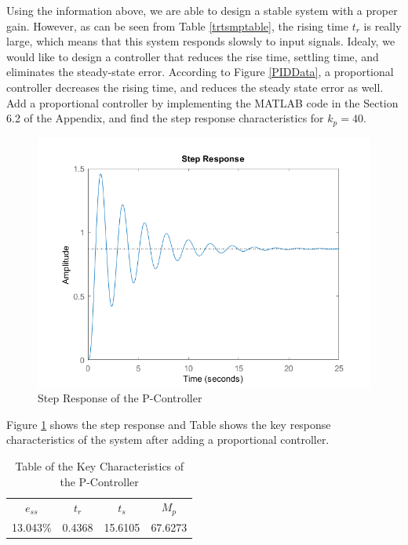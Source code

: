 \documentclass[a4paper, twocolumn, titlepage, 10pt]{article}
\begin{document}
		Using the information above, we are able to design a stable system with a proper gain. However, as can be seen from Table \ref{trtsmptable}, the rising time $t_r$ is really large, which means that this system responds slowsly to input signals. Idealy, we would like to design a controller that reduces the rise time, settling time, and eliminates the steady-state error. According to Figure \ref{PIDData}, a proportional controller decreases the rising time, and reduces the steady state error as well. Add a proportional controller by implementing the MATLAB code in the Section 6.2 of the Appendix, and find the step response characteristics for $k_p = 40$.
		\begin{figure}[H]
			\centering
			\includegraphics[width=\linewidth]{StepPC}
			\caption{Step Response of the P-Controller}
			\label{steppc}
		\end{figure}
		
		Figure \ref{steppc} shows the step response and Table shows the key response characteristics of the system after adding a proportional controller. 
		\begin{table}[H]
			\centering
			\begin{tabular}{c c c c}
				$e_{ss}$ & $t_r$ & $t_s$ & $M_p$ \\
				13.043\% & 0.4368 & 15.6105 & 67.6273
			\end{tabular}
			\caption{Table of the Key Characteristics of the P-Controller}
			\label{responseCharPC}
		\end{table}
		
\end{document}
